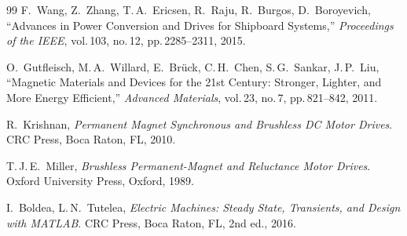 ﻿\documentclass[a4paper,12pt]{article}
\theoremstyle{definition}
\begin{document}
\begin{thebibliography}{99}
F.\ Wang, Z.\ Zhang, T.\,A.\ Ericsen, R.\ Raju, R.\ Burgos, D.\ Boroyevich,
``Advances in Power Conversion and Drives for Shipboard Systems,''
\textit{Proceedings of the IEEE}, vol.\,103, no.\,12, pp.\,2285--2311, 2015.

O.\ Gutfleisch, M.\,A.\ Willard, E.\ Brück, C.\,H.\ Chen, S.\,G.\ Sankar,
J.\,P.\ Liu,
``Magnetic Materials and Devices for the 21st Century: Stronger, Lighter,
and More Energy Efficient,''
\textit{Advanced Materials}, vol.\,23, no.\,7, pp.\,821--842, 2011.

R.\ Krishnan,
\textit{Permanent Magnet Synchronous and Brushless DC Motor Drives}.
CRC Press, Boca Raton, FL, 2010.

T.\,J.\,E.\ Miller,
\textit{Brushless Permanent-Magnet and Reluctance Motor Drives}.
Oxford University Press, Oxford, 1989.

I.\ Boldea, L.\,N.\ Tutelea,
\textit{Electric Machines: Steady State, Transients, and Design with MATLAB}.
CRC Press, Boca Raton, FL, 2nd ed., 2016.

\end{thebibliography}
\end{document}
